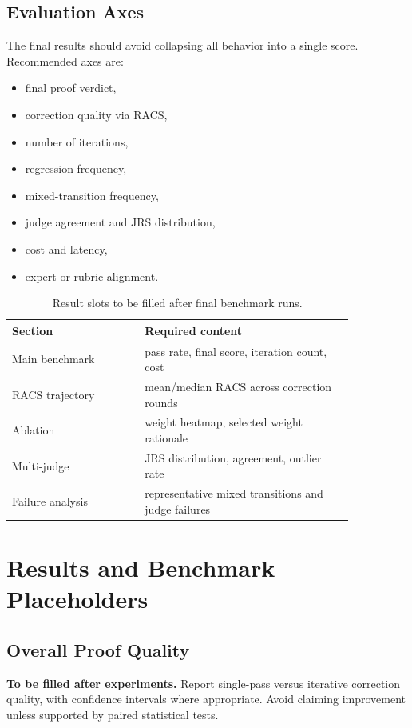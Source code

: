 \documentclass[conference]{IEEEtran}
\begin{document}
\subsection{Evaluation Axes}
The final results should avoid collapsing all behavior into a single score. Recommended axes are:
\begin{itemize}
    \item final proof verdict,
    \item correction quality via RACS,
    \item number of iterations,
    \item regression frequency,
    \item mixed-transition frequency,
    \item judge agreement and JRS distribution,
    \item cost and latency,
    \item expert or rubric alignment.
\end{itemize}

\begin{table}[t]
\caption{Result slots to be filled after final benchmark runs.}
\centering
\begin{tabular}{p{0.33\linewidth}p{0.52\linewidth}}
\toprule
\textbf{Section} & \textbf{Required content} \\
\midrule
Main benchmark & pass rate, final score, iteration count, cost \\
RACS trajectory & mean/median RACS across correction rounds \\
Ablation & weight heatmap, selected weight rationale \\
Multi-judge & JRS distribution, agreement, outlier rate \\
Failure analysis & representative mixed transitions and judge failures \\
\bottomrule
\end{tabular}
\label{tab:result_slots}
\end{table}

\section{Results and Benchmark Placeholders}
\label{sec:results}

\subsection{Overall Proof Quality}
\noindent\textbf{To be filled after experiments.} Report single-pass versus iterative correction quality, with confidence intervals where appropriate. Avoid claiming improvement unless supported by paired statistical tests.
\end{document}
